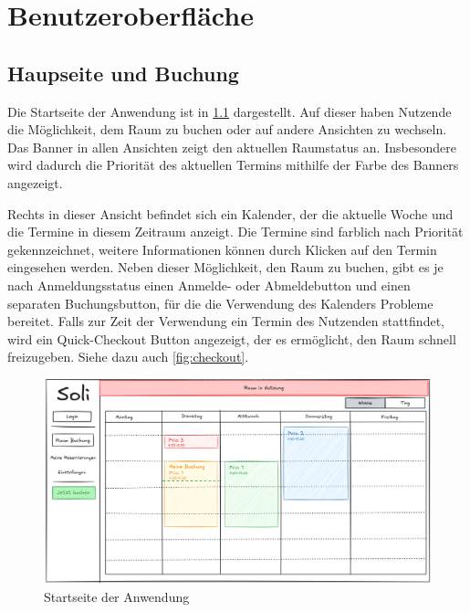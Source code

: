 
\chapter{Benutzeroberfläche}
\label{chap:ui}

\section{Haupseite und Buchung}

Die Startseite der Anwendung ist in \ref{fig:startseite} dargestellt.
Auf dieser haben Nutzende die Möglichkeit, dem Raum zu buchen oder auf andere Ansichten zu wechseln.
Das Banner in allen Ansichten zeigt den aktuellen Raumstatus an.
Insbesondere wird dadurch die Priorität des aktuellen Termins mithilfe der Farbe des Banners angezeigt.

Rechts in dieser Ansicht befindet sich ein Kalender, der die aktuelle Woche und die Termine in diesem Zeitraum anzeigt.
Die Termine sind farblich nach Priorität gekennzeichnet, weitere Informationen können durch Klicken auf den Termin eingesehen werden.
Neben dieser Möglichkeit, den Raum zu buchen, gibt es je nach Anmeldungsstatus einen Anmelde- oder Abmeldebutton und einen separaten Buchungsbutton,
für die die Verwendung des Kalenders Probleme bereitet.
Falls zur Zeit der Verwendung ein Termin des Nutzenden stattfindet, wird ein Quick-Checkout Button angezeigt,
der es ermöglicht, den Raum schnell freizugeben.
Siehe dazu auch \ref{fig:checkout}.

\begin{figure}[ht]
    \centering
    \includegraphics[width=\textwidth]{figures/ui/startseite}
    \caption{Startseite der Anwendung}
    \label{fig:startseite}
\end{figure}
\pagebreak

